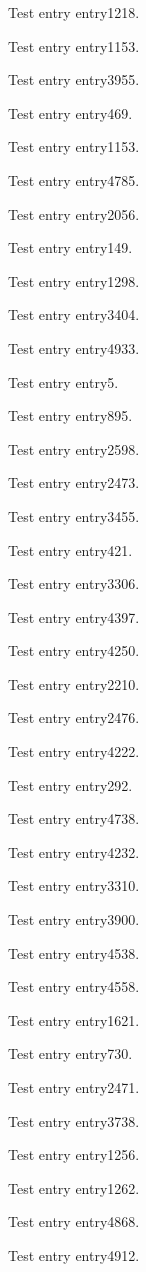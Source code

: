 Test entry \gls{entry1218}.

Test entry \gls{entry1153}.

Test entry \gls{entry3955}.

Test entry \gls{entry469}.

Test entry \gls{entry1153}.

Test entry \gls{entry4785}.

Test entry \gls{entry2056}.

Test entry \gls{entry149}.

Test entry \gls{entry1298}.

Test entry \gls{entry3404}.

Test entry \gls{entry4933}.

Test entry \gls{entry5}.

Test entry \gls{entry895}.

Test entry \gls{entry2598}.

Test entry \gls{entry2473}.

Test entry \gls{entry3455}.

Test entry \gls{entry421}.

Test entry \gls{entry3306}.

Test entry \gls{entry4397}.

Test entry \gls{entry4250}.

Test entry \gls{entry2210}.

Test entry \gls{entry2476}.

Test entry \gls{entry4222}.

Test entry \gls{entry292}.

Test entry \gls{entry4738}.

Test entry \gls{entry4232}.

Test entry \gls{entry3310}.

Test entry \gls{entry3900}.

Test entry \gls{entry4538}.

Test entry \gls{entry4558}.

Test entry \gls{entry1621}.

Test entry \gls{entry730}.

Test entry \gls{entry2471}.

Test entry \gls{entry3738}.

Test entry \gls{entry1256}.

Test entry \gls{entry1262}.

Test entry \gls{entry4868}.

Test entry \gls{entry4912}.

